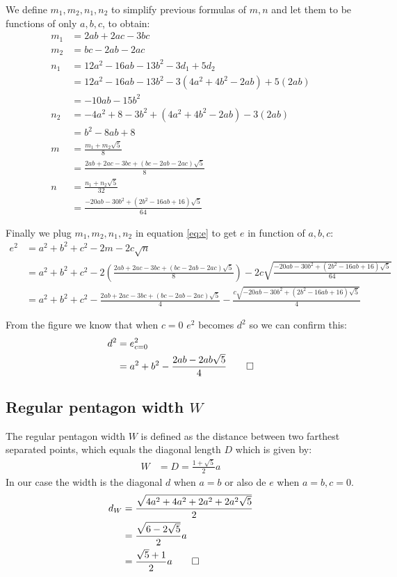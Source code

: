 \documentclass[11pt]{article}
\begin{document}
We define $m_1,m_2,n_1,n_2$ to simplify previous formulas of $m,n$ 
and let them to be functions of only $a,b,c$, to obtain:
\begin{align}
m_1 &= 2ab + 2ac - 3bc \\
m_2 &= bc -2ab - 2ac\\
n_1 &= 12a^2 - 16ab - 13b^2 - 3d_1 + 5d_2\nonumber\\
 &= 12a^2 - 16ab - 13b^2 - 3(4a^2 + 4b^2 - 2ab) + 5(2ab)\nonumber\\
 &= - 10ab - 15b^2\\
n_2 &= -4a^2 + 8 - 3b^2 + (4a^2 + 4b^2 - 2ab) - 3(2ab)\nonumber\\
 &= b^2 - 8ab + 8\\
m &= \frac{m_1 + m_2\sqrt5}8\nonumber\\
 &= \frac{2ab + 2ac - 3bc + (bc -2ab - 2ac)\sqrt5}8\\
n &= \frac{n_1 + n_2\sqrt5}{32}\nonumber\\
 &= \frac{- 20ab - 30b^2 + (2b^2 - 16ab + 16)\sqrt5}{64}
\end{align}

Finally we plug $m_1,m_2,n_1,n_2$ in equation \ref{eq:e} to get $e$ in function of $a,b,c$:
\begin{align}
e^2 &= a^2 + b^2 + c^2 - 2m - 2c\sqrt{n}\nonumber\\
 &= a^2 + b^2 + c^2
 - 2\left(\frac{2ab + 2ac - 3bc + (bc -2ab - 2ac)\sqrt5}8\right)
 - 2c\sqrt{\frac{- 20ab - 30b^2 + (2b^2 - 16ab + 16)\sqrt5}{64}}\nonumber\\
 &= a^2 + b^2 + c^2
 - \frac{2ab + 2ac - 3bc + (bc -2ab - 2ac)\sqrt5}4
 - \frac{c\sqrt{- 20ab - 30b^2 + (2b^2 - 16ab + 16)\sqrt5}}4 \label{eq:e-penta}
\end{align}

From the figure we know that when $c=0$ $e^2$ becomes $d^2$ so we can confirm this:
\begin{align}
d^2 &= e^2_{c=0}\nonumber\\
 &= a^2 + b^2 - \frac{2ab -2ab\sqrt5}{4} \qed
\end{align}
\subsection{Regular pentagon width $W$}

The regular pentagon width $W$ is defined as the 
distance between two farthest separated points, which equals the diagonal length $D$
which is given by:
\begin{align}
W &= D = \frac{1+\sqrt5}{2}a
\end{align}
In our case the width is the diagonal $d$ when $a=b$ or also de $e$ when $a=b,c=0$.
\begin{align}
d_W &= \frac{\sqrt{4a^2 + 4a^2 + 2a^2 + 2a^2\sqrt5}}2\nonumber\\
 &= \frac{\sqrt{6-2\sqrt5}}{2}a\nonumber\\
 &= \frac{\sqrt5+1}{2}a \qed
\end{align}
\end{document}
